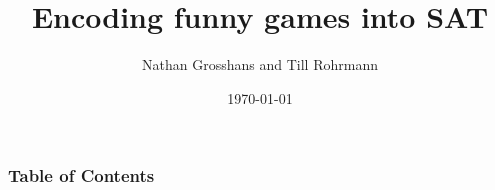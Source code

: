 
\usepackage[utf8]{inputenc}
\usepackage[T1]{fontenc}
\usepackage{lmodern}
\usepackage{amsthm}
\usepackage{amsmath}
\usepackage{graphicx}
\usepackage{float}
\usepackage{caption}
\captionsetup{labelformat=empty,labelsep=none}
\DeclareMathOperator*{\E}{\mathbb{E}}

\title{Encoding funny games into SAT}
\author[N. Grosshans \& T. Rohrmann]{Nathan Grosshans and Till Rohrmann}
\date{\today}
\subject{Encoding funny games into SAT}



		\frame{\titlepage}
		\begin{frame}
			\frametitle{Table of Contents}
			\tableofcontents
		\end{frame}
		
		
		
		

